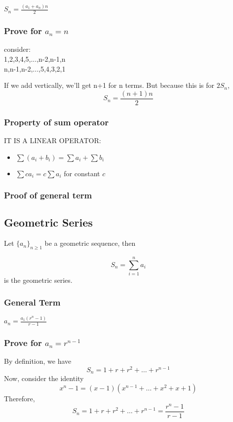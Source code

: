 \documentclass{article}
\begin{document}
$S_n = \frac{(a_1+a_n)n}{2}$

\subsubsection{Prove for $a_n=n$}

consider:
\\
1,2,3,4,5,...,n-2,n-1,n\\
n,n-1,n-2,...,5,4,3,2,1

If we add vertically, we'll get n+1 for n terms.
But because this is for $2S_n$, $$S_n=\frac{(n+1)n}{2}$$

\subsubsection{Property of sum operator}

IT IS A LINEAR OPERATOR:

\begin{itemize}
    \item $\sum (a_i+b_i) = \sum a_i + \sum b_i$
    \item $\sum ca_i = c \sum a_i$ for constant $c$
\end{itemize}

\subsubsection{Proof of general term}
\newpage

\subsection{Geometric Series}

Let $\{a_n\}_{n\ge1}$ be a geometric sequence, then 

$$S_n=\sum_{i=1}^{n}a_i$$ 
is the geometric series.

\subsubsection{General Term}

$a_n = \frac{a_1(r^{n}-1)}{r-1}$

\subsubsection{Prove for $a_n=r^{n-1}$}
By definition, we have
$$S_n=1+r+r^2+\dots+r^{n-1}$$
Now, consider the identity $$x^n-1=(x-1)(x^{n-1}+\dots+x^2+x+1)$$
Therefore,
$$S_n=1+r+r^2+\dots+r^{n-1}=\frac{r^n-1}{r-1}$$
\end{document}
